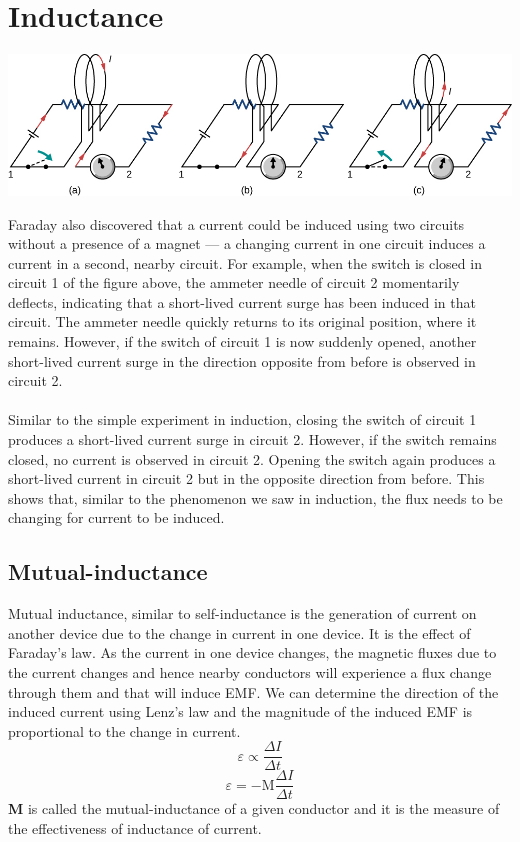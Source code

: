 \documentclass[9pt]{article}
\begin{document}
	\section*{Inductance}
	\begin{center}
		\includegraphics[scale=0.8]{faraday_ind}
	\end{center}
	Faraday also discovered that a current could be induced using two circuits without a presence of a magnet — a changing current in one circuit induces a current in a second, nearby circuit. For example, when the switch is closed in circuit 1 of the figure above, the ammeter needle of circuit 2 momentarily deflects, indicating that a short-lived current surge has been induced in that circuit. The ammeter needle quickly returns to its original position, where it remains. However, if the switch of circuit 1 is now suddenly opened, another short-lived current surge in the direction opposite from before is observed in circuit 2. \\ \\
	Similar to the simple experiment in induction, closing the switch of circuit 1 produces a short-lived current surge in circuit 2. However, if the switch remains closed, no current is observed in circuit 2. Opening the switch again produces a short-lived current in circuit 2 but in the opposite direction from before. This shows that, similar to the phenomenon we saw in induction, the flux needs to be changing for current to be induced.
	\subsection*{Mutual-inductance}
	Mutual inductance, similar to self-inductance is the generation of current on another device due to the change in current in one device. It is the effect of Faraday's law. As the current in one device changes, the magnetic fluxes due to the current changes and hence nearby conductors will experience a flux change through them and that will induce EMF. We can determine the direction of the induced current using Lenz's law and the magnitude of the induced EMF is proportional to the change in current.
	$$\varepsilon\propto\dfrac{\varDelta I}{\varDelta t}$$
	$$\varepsilon=-\text{M}\dfrac{\varDelta I}{\varDelta t}$$
	\textbf{M} is called the mutual-inductance of a given conductor and it is the measure of the effectiveness of inductance of current.
\end{document}
